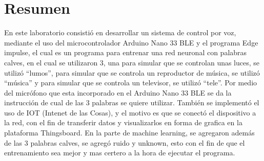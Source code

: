 \section{Resumen}

En este laboratorio consistió en desarrollar un sistema de control por voz, mediante el uso del microcontrolador Arduino Nano 33 BLE y el programa Edge impulse, el cual es un programa para entrenar una red neuronal con palabras calves, en el cual se utilizaron 3, una para simular que se controlan unas luces, se utilizó ``lumos'', para simular que se controla un reproductor de música, se utilizó ``música'' y para simular que se controla un televisor, se utilizó ``tele''. Por medio del micrófono que esta incorporado en el Arduino Nano 33 BLE se da la instrucción de cual de las 3 palabras se quiere utilizar. También se implementó el uso de IOT (Intenet de las Cosas), y el motivo es que se conectó el dispositivo a la red, con el fin de transferir datos y visualizarlos en forma de grafica en la plataforma Thingsboard. En la parte de machine learning, se agregaron además de las 3 palabras calves, se agregó ruido y unknown, esto con el fin de que el entrenamiento sea mejor y mas certero a la hora de ejecutar el programa.
